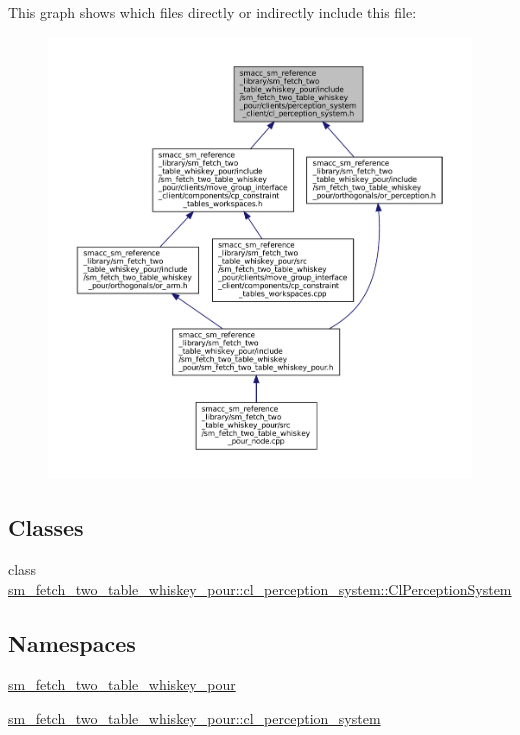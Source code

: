 This graph shows which files directly or indirectly include this file\+:
\nopagebreak
\begin{figure}[H]
\begin{center}
\leavevmode
\includegraphics[width=350pt]{sm__fetch__two__table__whiskey__pour_2include_2sm__fetch__two__table__whiskey__pour_2clients_2pecab11082bfb13285109010285da1b226}
\end{center}
\end{figure}
\subsection*{Classes}
\begin{DoxyCompactItemize}
\item 
class \hyperlink{classsm__fetch__two__table__whiskey__pour_1_1cl__perception__system_1_1ClPerceptionSystem}{sm\+\_\+fetch\+\_\+two\+\_\+table\+\_\+whiskey\+\_\+pour\+::cl\+\_\+perception\+\_\+system\+::\+Cl\+Perception\+System}
\end{DoxyCompactItemize}
\subsection*{Namespaces}
\begin{DoxyCompactItemize}
\item 
 \hyperlink{namespacesm__fetch__two__table__whiskey__pour}{sm\+\_\+fetch\+\_\+two\+\_\+table\+\_\+whiskey\+\_\+pour}
\item 
 \hyperlink{namespacesm__fetch__two__table__whiskey__pour_1_1cl__perception__system}{sm\+\_\+fetch\+\_\+two\+\_\+table\+\_\+whiskey\+\_\+pour\+::cl\+\_\+perception\+\_\+system}
\end{DoxyCompactItemize}
